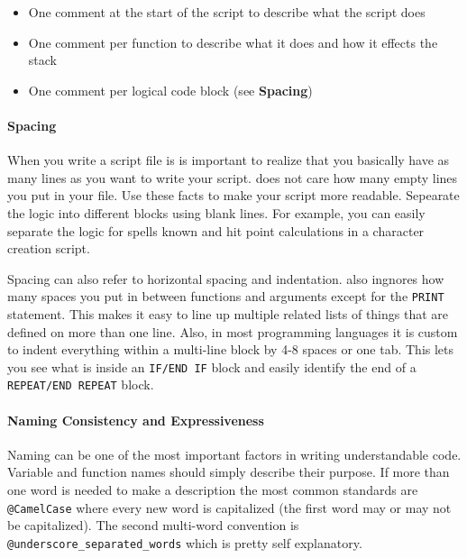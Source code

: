 \begin{itemize}
    \item One comment at the start of the script to describe what the script does
    \item One comment per function to describe what it does and how it effects the stack
    \item One comment per logical code block (see \textbf{Spacing})
\end{itemize}

\paragraph*{Spacing\\}
\hspace*{\parindent}%
When you write a script file is is important to realize that you basically
have as many lines as you want to write your script. \progLogo does not care
how many empty lines you put in your file. Use these facts to make your
script more readable. Sepearate the logic into different blocks using blank
lines. For example, you can easily separate the logic for spells known and 
hit point calculations in a character creation script.

Spacing can also refer to horizontal spacing and indentation. \progLogo also
ingnores how many spaces you put in between functions and arguments except
for the \texttt{PRINT} statement. This makes it easy to line up multiple
related lists of things that are defined on more than one line. Also, in
most programming languages it is custom to indent everything within
a multi-line block by 4-8 spaces or one tab. This lets you see what is inside
an \texttt{IF/END IF} block and easily identify the end of a \texttt{REPEAT/END
REPEAT} block.

\paragraph*{Naming Consistency and Expressiveness\\}
\hspace*{\parindent}%
Naming can be one of the most important factors in writing understandable code.
Variable and function names should simply describe their purpose. If more than
one word is needed to make a description the most common standards are
\texttt{@CamelCase} where every new word is capitalized (the first word may or
may not be capitalized). The second multi-word convention is
\texttt{@underscore\_separated\_words} which is pretty self explanatory.

